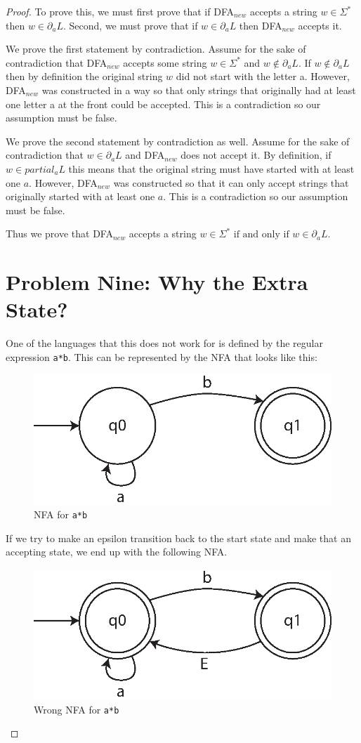 \documentclass[10pt,letter]{article}
\begin{document}
\begin{proof} To prove this, we must first prove that if DFA$_{new}$ accepts a string $w \in \Sigma^*$ then $w \in \partial_a L$. Second, we must prove that if $w \in \partial_a L$ then DFA$_{new}$ accepts it.

We prove the first statement by contradiction. Assume for the sake of contradiction that DFA$_{new}$ accepts some string $w \in \Sigma^*$ and $w \not \in \partial_a L$. If $w \not \in \partial_a L$ then by definition the original string $w$ did not start with the letter a. However, DFA$_{new}$ was constructed in a way so that only strings that originally had at least one letter a at the front could be accepted. This is a contradiction so our assumption must be false.

We prove the second statement by contradiction as well. Assume for the sake of contradiction that $w \in \partial_a L$ and DFA$_{new}$ does not accept it. By definition, if $w \in partial_a L$ this means that the original string must have started with at least one $a$. However, DFA$_{new}$ was constructed so that it can only accept strings that originally started with at least one $a$. This is a contradiction so our assumption must be false.

Thus we prove that DFA$_{new}$ accepts a string $w \in \Sigma^* \text{ if and only if } w \in \partial_a L$. 

\section*{Problem Nine: Why the Extra State?} 
One of the languages that this does not work for is defined by the regular expression \texttt{a*b}. This can be represented by the NFA that looks like this:

\begin{figure}[h]
\centering
  \includegraphics[width=0.45\linewidth]{9i.eps}
  \caption{NFA for \texttt{a*b}}
  \label{fig:9i}
\end{figure}

If we try to make an epsilon transition back to the start state and make that an accepting state, we end up with the following NFA.

\begin{figure}[h]
\centering
  \includegraphics[width=0.45\linewidth]{9ii.eps}
  \caption{Wrong NFA for \texttt{a*b}}
  \label{fig:9ii}
\end{figure}


\end{proof}
\end{document}
